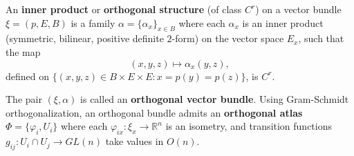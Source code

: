 An \textbf{inner product} or \textbf{orthogonal structure} (of class $C^r$) on a vector bundle $\xi = (p, E, B)$ is a family $\alpha = \{\alpha_x\}_{x \in B}$ where each $\alpha_x$ is an inner product (symmetric, bilinear, positive definite $2$-form) on the vector space $E_x$, such that the map
$$(x, y, z) \mapsto \alpha_x(y, z),$$
defined on $\{(x, y, z) \in B \times E \times E : x = p(y) = p(z)\}$, is $C^r$.

The pair $(\xi, \alpha)$ is called an \textbf{orthogonal vector bundle}. Using Gram-Schmidt orthogonalization, an orthogonal bundle admits an \textbf{orthogonal atlas} $\Phi = \{\varphi_i, U_i\}$ where each $\varphi_{ix}: \xi_x \to \mathbb{R}^n$ is an isometry, and transition functions $g_{ij}: U_i \cap U_j \to GL(n)$ take values in $O(n)$.
